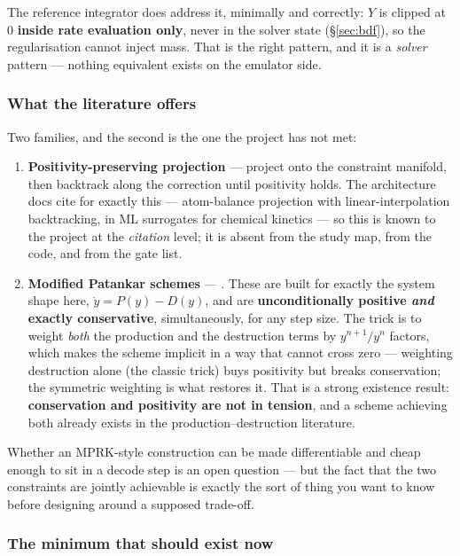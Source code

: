 The reference integrator does address it, minimally and correctly: $Y$ is
clipped at 0 \textbf{inside rate evaluation only}, never in the solver state
(\S\ref{sec:bdf}), so the regularisation cannot inject mass. That is the right
pattern, and it is a \emph{solver} pattern --- nothing equivalent exists on the
emulator side.

\subsubsection{What the literature offers}
\label{sec:poslit}

Two families, and the second is the one the project has not met:

\begin{enumerate}
\item \textbf{Positivity-preserving projection} --- project onto the constraint
  manifold, then backtrack along the correction until positivity holds. The
  architecture docs cite \citet{kircher2025} for exactly this --- atom-balance
  projection with linear-interpolation backtracking, in ML surrogates for
  chemical kinetics --- so this is known to the project at the \emph{citation}
  level; it is absent from the study map, from the code, and from the gate list.
\item \textbf{Modified Patankar schemes} --- \citet{burchard2003}. These are
  built for exactly the system shape here, $\dot y = P(y) - D(y)$, and are
  \textbf{unconditionally positive \emph{and} exactly conservative},
  simultaneously, for any step size. The trick is to weight \emph{both} the
  production and the destruction terms by $y^{n+1}/y^{n}$ factors, which makes
  the scheme implicit in a way that cannot cross zero --- weighting destruction
  alone (the classic \citealp{patankar1980} trick) buys positivity but breaks
  conservation; the symmetric weighting is what restores it. That is a strong
  existence result: \textbf{conservation and positivity are not in tension}, and
  a scheme achieving both already exists in the production--destruction
  literature.
\end{enumerate}

Whether an MPRK-style construction can be made differentiable and cheap enough
to sit in a decode step is an open question --- but the fact that the two
constraints are jointly achievable is exactly the sort of thing you want to know
before designing around a supposed trade-off.

\subsubsection{The minimum that should exist now}
\label{sec:posminimum}

